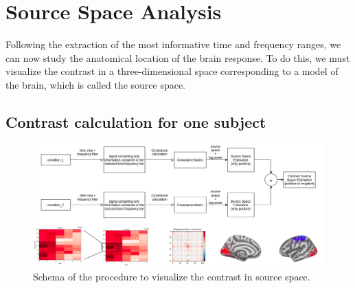 
\section{Source Space Analysis}

Following the extraction of the most informative time and frequency ranges, we can now study the anatomical location of the brain response. To do this, we must visualize the contrast in a three-dimensional space corresponding to a model of the brain, which is called the source space.




\subsection{Contrast calculation for one subject}
\begin{figure}[ht]
    \centering
    \includegraphics[width=15cm]{images_report/source/flow_source_contrasts.png}
    \caption[Shema of the procedure to visualize the contrast in source space.]%
    {Schema of the procedure to visualize the contrast in source space.}
    \label{flow_source_contrasts}
\end{figure}


